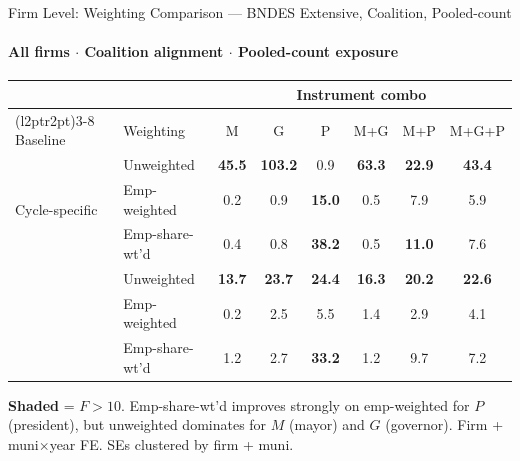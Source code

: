\documentclass[aspectratio=169,10pt]{beamer}
\newcommand{\fpass}[1]{\cellcolor{pass}\textbf{#1}}
\begin{document}

\begin{frame}[t]{Firm Level: Weighting Comparison --- BNDES Extensive, Coalition, Pooled-count}
\framesubtitle{All firms $\cdot$ Coalition alignment $\cdot$ Pooled-count exposure}
\begin{center}
\footnotesize
\setlength{\tabcolsep}{3.5pt}
\renewcommand{\arraystretch}{1.05}
\begin{tabular}{@{}llcccccc@{}}
\toprule
 & & \multicolumn{6}{c}{Instrument combo} \\
\cmidrule(l{2pt}r{2pt}){3-8}
Baseline & Weighting & M & G & P & M+G & M+P & M+G+P \\
\midrule
\multirow{3}{*}{Cycle-specific}
  & Unweighted      & \fpass{45.5} & \fpass{103.2} & 0.9  & \fpass{63.3} & \fpass{22.9} & \fpass{43.4} \\
  & Emp-weighted    & 0.2          & 0.9           & \fpass{15.0}  & 0.5          & 7.9          & 5.9          \\
  & Emp-share-wt'd  & 0.4          & 0.8           & \fpass{38.2}  & 0.5          & \fpass{11.0} & 7.6          \\
\addlinespace[5pt]
\multirow{3}{*}{2002-fixed}
  & Unweighted      & \fpass{13.7} & \fpass{23.7}  & \fpass{24.4} & \fpass{16.3} & \fpass{20.2} & \fpass{22.6} \\
  & Emp-weighted    & 0.2          & 2.5           & 5.5          & 1.4          & 2.9          & 4.1          \\
  & Emp-share-wt'd  & 1.2          & 2.7           & \fpass{33.2} & 1.2          & 9.7          & 7.2          \\
\bottomrule
\end{tabular}
\end{center}
{\scriptsize \colorbox{pass}{\textbf{Shaded}} = $F>10$.
Emp-share-wt'd improves strongly on emp-weighted for $P$ (president), but unweighted dominates for $M$ (mayor) and $G$ (governor).
Firm + muni$\times$year FE. SEs clustered by firm + muni.}
\end{frame}

\end{document}
